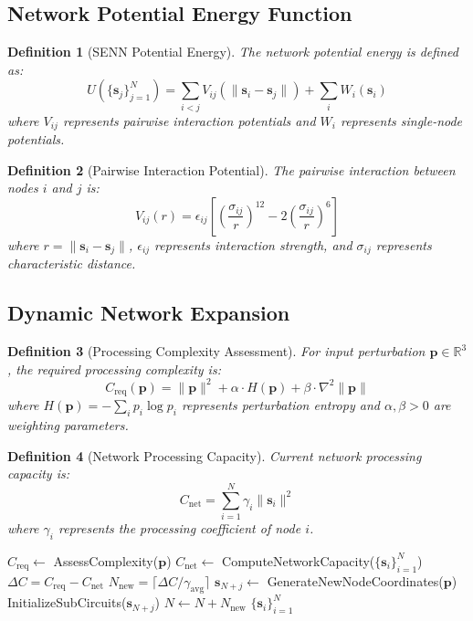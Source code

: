 \documentclass[12pt,a4paper]{article}
\newtheorem{definition}{Definition}
\begin{document}
\subsection{Network Potential Energy Function}

\begin{definition}[SENN Potential Energy]
The network potential energy is defined as:
$$U(\{\mathbf{s}_j\}_{j=1}^N) = \sum_{i<j} V_{ij}(\|\mathbf{s}_i - \mathbf{s}_j\|) + \sum_i W_i(\mathbf{s}_i)$$
where $V_{ij}$ represents pairwise interaction potentials and $W_i$ represents single-node potentials.
\end{definition}

\begin{definition}[Pairwise Interaction Potential]
The pairwise interaction between nodes $i$ and $j$ is:
$$V_{ij}(r) = \epsilon_{ij} \left[ \left(\frac{\sigma_{ij}}{r}\right)^{12} - 2\left(\frac{\sigma_{ij}}{r}\right)^6 \right]$$
where $r = \|\mathbf{s}_i - \mathbf{s}_j\|$, $\epsilon_{ij}$ represents interaction strength, and $\sigma_{ij}$ represents characteristic distance.
\end{definition}

\subsection{Dynamic Network Expansion}

\begin{definition}[Processing Complexity Assessment]
For input perturbation $\mathbf{p} \in \mathbb{R}^3$, the required processing complexity is:
$$C_{\text{req}}(\mathbf{p}) = \|\mathbf{p}\|^2 + \alpha \cdot H(\mathbf{p}) + \beta \cdot \nabla^2 \|\mathbf{p}\|$$
where $H(\mathbf{p}) = -\sum_i p_i \log p_i$ represents perturbation entropy and $\alpha, \beta > 0$ are weighting parameters.
\end{definition}

\begin{definition}[Network Processing Capacity]
Current network processing capacity is:
$$C_{\text{net}} = \sum_{i=1}^N \gamma_i \|\mathbf{s}_i\|^2$$
where $\gamma_i$ represents the processing coefficient of node $i$.
\end{definition}

\begin{algorithm}[H]
\caption{Dynamic Network Expansion}
\begin{algorithmic}[1]
    \State $C_{\text{req}} \gets$ AssessComplexity($\mathbf{p}$)
    \State $C_{\text{net}} \gets$ ComputeNetworkCapacity($\{\mathbf{s}_i\}_{i=1}^N$)
        \State $\Delta C = C_{\text{req}} - C_{\text{net}}$
        \State $N_{\text{new}} = \lceil \Delta C / \gamma_{\text{avg}} \rceil$
            \State $\mathbf{s}_{N+j} \gets$ GenerateNewNodeCoordinates($\mathbf{p}$)
            \State InitializeSubCircuits($\mathbf{s}_{N+j}$)
        \EndFor
        \State $N \gets N + N_{\text{new}}$
    \EndIf
    \State \Return $\{\mathbf{s}_i\}_{i=1}^N$
\EndProcedure
\end{algorithmic}
\end{algorithm}
\end{document}
